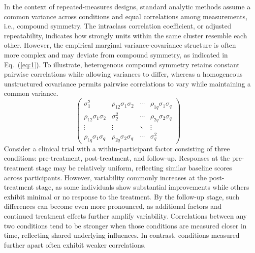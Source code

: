 \documentclass[preprint,12pt,authoryear]{elsarticle}
\begin{document}
In the context of repeated-measures designs, standard analytic methods assume a common variance across conditions and equal correlations among measurements, i.e., compound symmetry. The intraclass correlation coefficient, or adjusted repeatability, indicates how strongly units within the same cluster resemble each other. However, the empirical marginal variance-covariance structure is often more complex and may deviate from compound symmetry, as indicated in Eq.~(\ref{eq:1}). To illustrate, heterogenous compound symmetry retains constant pairwise correlations while allowing variances to differ, whereas a homogeneous unstructured covariance permits pairwise correlations to vary while maintaining a common variance.
\begin{equation} \label{eq:1}
	\begin{pmatrix}
		\sigma_1^2 & \rho_{12}\sigma_1\sigma_2 & \dotsb & \rho_{1q}\sigma_1\sigma_q \\
		\rho_{12}\sigma_1\sigma_2 & \sigma_2^2 & \dotsb &  \rho_{2q}\sigma_2\sigma_q \\
		\vdots & \vdots & \ddots & \vdots \\
		\rho_{1q}\sigma_1\sigma_q &  \rho_{2q}\sigma_2\sigma_q & \dotsb & \sigma_q^2
	\end{pmatrix}
\end{equation}
Consider a clinical trial with a within-participant factor consisting of three conditions: pre-treatment, post-treatment, and follow-up. Responses at the pre-treatment stage may be relatively uniform, reflecting similar baseline scores across participants. However, variability commonly increases at the post-treatment stage, as some individuals show substantial improvements while others exhibit minimal or no response to the treatment. By the follow-up stage, such differences can become even more pronounced, as additional factors and continued treatment effects further amplify variability. Correlations between any two conditions tend to be stronger when those conditions are measured closer in time, reflecting shared underlying influences. In contrast, conditions measured further apart often exhibit weaker correlations.
\end{document}
